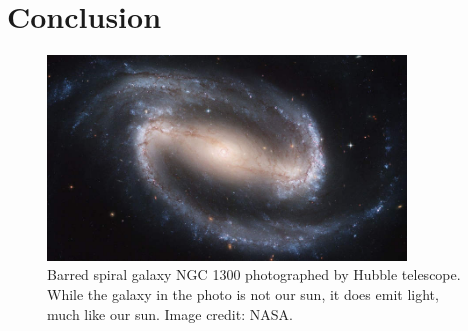 
\chapter{Conclusion}
\begin{refsection}


\begin{figure}[ht]
    \centering
	\includegraphics[width=0.85\textwidth]{figures/sampleFig1.jpg} 
	\caption[Barred spiral galaxy NGC 1300]{Barred spiral galaxy NGC 1300 photographed by Hubble telescope. While the galaxy in the photo is not our sun, it does emit light, much like our sun. Image credit: NASA.}
	\label{fig:firstFig}
\end{figure}


\clearpage

\printbibliography[heading=subbibintoc, title={\texorpdfstring{\centering}{} Notes}]
\end{refsection}